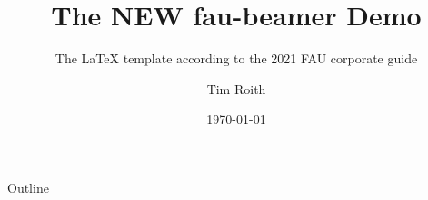 \documentclass[final, 12pt]{beamer}
\title[fau-beamer]{The NEW fau-beamer Demo}
\subtitle{The \LaTeX{} template according to the 2021 FAU corporate guide}
\author[T. Roith]{Tim Roith}
\institute[FAU]{Friedrich--Alexander Universität Erlangen--Nürnberg, Department Mathematik}
\date{\today}
\begin{document}
\begin{trueplainframe}{}
\titlepage%
\end{trueplainframe}
\begin{frame}[t]{Outline}
\tableofcontents
\end{frame}

\end{document}
